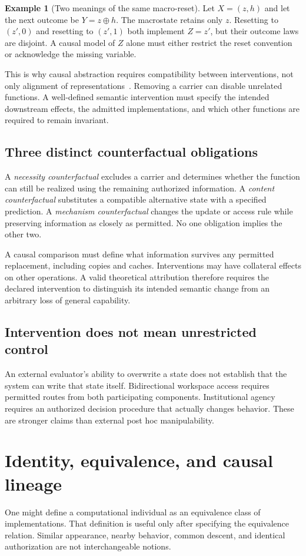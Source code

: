 \documentclass[11pt,letterpaper]{article}
\theoremstyle{plain}
\theoremstyle{definition}
\newtheorem{example}[proposition]{Example}
\theoremstyle{remark}
\begin{document}
\begin{example}[Two meanings of the same macro-reset]
Let $X=(z,h)$ and let the next outcome be $Y=z\oplus h$. The macrostate retains only $z$. Resetting to $(z',0)$ and resetting to $(z',1)$ both implement $Z=z'$, but their outcome laws are disjoint. A causal model of $Z$ alone must either restrict the reset convention or acknowledge the missing variable.
\end{example}

This is why causal abstraction requires compatibility between interventions, not only alignment of representations~\cite{rubenstein,beckers}. Removing a carrier can disable unrelated functions. A well-defined semantic intervention must specify the intended downstream effects, the admitted implementations, and which other functions are required to remain invariant.

\subsection{Three distinct counterfactual obligations}
A \emph{necessity counterfactual} excludes a carrier and determines whether the function can still be realized using the remaining authorized information. A \emph{content counterfactual} substitutes a compatible alternative state with a specified prediction. A \emph{mechanism counterfactual} changes the update or access rule while preserving information as closely as permitted. No one obligation implies the other two.

A causal comparison must define what information survives any permitted replacement, including copies and caches. Interventions may have collateral effects on other operations. A valid theoretical attribution therefore requires the declared intervention to distinguish its intended semantic change from an arbitrary loss of general capability.

\subsection{Intervention does not mean unrestricted control}
An external evaluator's ability to overwrite a state does not establish that the system can write that state itself. Bidirectional workspace access requires permitted routes from both participating components. Institutional agency requires an authorized decision procedure that actually changes behavior. These are stronger claims than external post hoc manipulability.

\section{Identity, equivalence, and causal lineage}\label{sec:identity}
One might define a computational individual as an equivalence class of implementations. That definition is useful only after specifying the equivalence relation. Similar appearance, nearby behavior, common descent, and identical authorization are not interchangeable notions.
\end{document}

